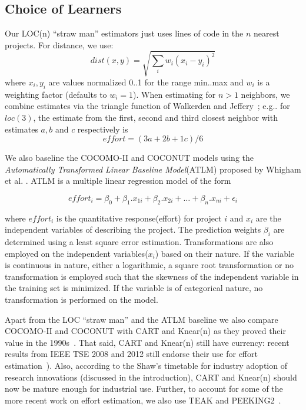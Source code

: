 \documentclass[smallcondesed]{svjour3}
\newenvironment{BLUE}{\color{blue}}{\ignorespacesafterend}
\newcommand{\HERE}[1]{\label{err:#1}
 \reversemarginpar\marginnote{\textcolor{blue}{(#1)}}}
\begin{document}
\subsection{Choice of Learners}\label{sect:whatlearn}

Our LOC(n) ``straw man'' 
estimators just uses  lines of code
in the $n$ nearest projects. For distance,
we use:
\begin{equation}\label{eq:dist}
\mathit{dist}(x,y) = \sqrt{\sum_i w_i (x_i-y_i)^2}
\end{equation} 
where $x_i,y_i$ 
are values normalized 0..1 for the range min..max
and $w_i$ is a weighting factor (defaults to $w_i=1$).
When  estimating for $n>1$ neighbors,
we combine estimates via the triangle 
function of  Walkerden
and Jeffery~\cite{Walkerden1999}; 
e.g.. for $loc(3)$, the  estimate
from the first, second and third closest neighbor with estimates
$a,b$ and $c$ respectively is
\HERE{Reviewer1c}
\begin{equation}\label{eq:tri}
\mathit{effort} = (3a + 2b + 1c)/6
\end{equation}

\begin{BLUE}
  \HERE{Reviewer2c}
We also baseline the COCOMO-II and COCONUT models using the \textit{Automatically Transformed Linear Baseline Model}(ATLM) proposed by Whigham et al. \cite{whigham15}. ATLM is a multiple linear regression model of the form

\begin{equation}
    \label{eq:atlm}
    effort_i = \beta_0 + \beta_1.x_{1i} + \beta_2.x_{2i} + \ldots + \beta_n.x_{ni} + \epsilon_i
\end{equation}

where $effort_i$ is the quantitative response(effort) for project $i$ and $x_i$ are the independent variables of describing the project. The prediction weights $\beta_i$ are determined using a least square error estimation. Transformations are also employed on the independent variables($x_i$) based on their nature. If the variable is continuous in nature, either a logarithmic, a square root transformation or no transformation is employed such that the skewness of the independent variable in the training set is minimized. If the variable is of categorical nature, no transformation is performed on the model.

\end{BLUE}

Apart from the LOC ``straw man'' and the ATLM baseline
we also compare COCOMO-II and COCONUT with CART
and Knear(n) as they proved their value  in the 1990s~\cite{shepperd97,Walkerden1999}. That said, CART and Knear(n)
still have currency: 
recent results from IEEE TSE 2008 and 2012 still endorse their  use for effort estimation~\cite{dejaeger12,koc11a,keung2008b}).
Also, according to the Shaw's timetable for industry adoption of research innovations
(discussed in the introduction),  CART and Knear(n) should now be mature enough for industrial use.
Further, to account for some of the more recent work on effort estimation, we also use TEAK and PEEKING2~\cite{koc11b,papa13}.
\end{document}
